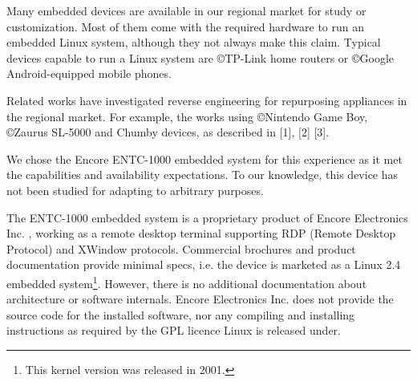 \documentclass[conference]{IEEEtran}
\newcommand{\nota}[1]{}
\begin{document}
\nota{Existen decenas de dispositivos embebidos en el mercado regional,
que pueden adquirirse para su estudio y adaptación. Y,
aunque muchas veces no se encuentren visiblemente etiquetados o documentados,
gran parte de estos sistemas contienen el hardware necesario
para ejecutar un sistema operativo Linux embebido. Ejemplos de estos dispositivos
capaces de ejecutar un sistema Linux son los routers hogareños \copyright TP-Link,
y los teléfonos móviles con sistema \copyright  Google Android \cite{android}.
}
Many embedded devices are available in our regional market for study or customization. Most of them come with the required hardware to run an embedded Linux system, although they not always make this claim. Typical devices capable to run a Linux system are \copyright TP-Link home routers or \copyright Google Android-equipped mobile phones.

Related works have investigated
reverse engineering for repurposing appliances in the regional market.
For example, the works using \copyright Nintendo Game Boy, \copyright Zaurus SL-5000 and Chumby devices,
as described in [1], [2] [3].

We chose the Encore ENTC-1000 embedded system for this experience
as it met the capabilities and availability expectations. To our
knowledge, this device has not been studied for adapting to
arbitrary purposes.





\nota{
El sistema embebido ENTC-1000 es un producto propietario de Encore Electronics Inc \cite{encore},
que funciona como una terminal de escritorio remoto, soportando
los protocolos RDP (Remote-Desktop-Protocol) y Xwindow. Si bien el folleto
comercial y su documentación proveen especificaciones mínimas,
esto es, se publicita como un sistema con Linux embebido kernel 2.4 
\footnote{Año 2001}, no existe información adicional de la arquitectura o funcionamiento
interno del software. Tampoco provee, Encore Electronic Inc.,
el código fuente del software instalado, ni las instrucciones
para su compilación e instalación (como es requerido por la licencia GPL de Linux \cite{gpl}).
}

The ENTC-1000 embedded system is a proprietary product of Encore Electronics Inc. \cite{encore},
working as a remote desktop terminal supporting RDP (Remote Desktop Protocol) and XWindow protocols. Commercial brochures and product documentation provide minimal specs, i.e. the device is marketed as a Linux 2.4 embedded system\footnote{This kernel version was released in 2001.}. However, there is no additional documentation about architecture or software internals. Encore Electronics Inc. does not provide the source code for the installed software, nor any compiling and installing instructions as required by the GPL licence Linux is released under\cite{gpl}.
\end{document}
